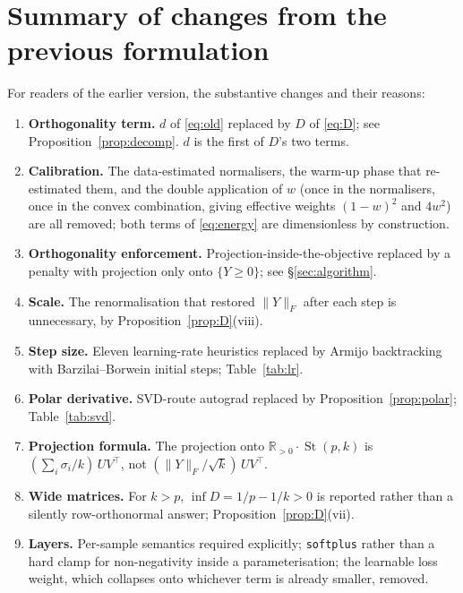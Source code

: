 \documentclass[11pt]{article}
\theoremstyle{definition}
\DeclareMathOperator{\st}{St}
\newcommand{\R}{\mathbb{R}}
\newcommand{\Rpos}{\R_{>0}}
\newcommand{\Fnorm}[1]{\lVert #1 \rVert_F}
\begin{document}



\appendix
\section{Summary of changes from the previous formulation}

For readers of the earlier version, the substantive changes and their reasons:

\begin{enumerate}\itemsep2pt
\item \textbf{Orthogonality term.} $d$ of \eqref{eq:old} replaced by $D$ of
  \eqref{eq:D}; see Proposition~\ref{prop:decomp}. $d$ is the first of $D$'s two
  terms.
\item \textbf{Calibration.} The data-estimated normalisers, the warm-up phase
  that re-estimated them, and the double application of $w$ (once in the
  normalisers, once in the convex combination, giving effective weights
  $(1-w)^2$ and $4w^2$) are all removed; both terms of \eqref{eq:energy} are
  dimensionless by construction.
\item \textbf{Orthogonality enforcement.} Projection-inside-the-objective
  replaced by a penalty with projection only onto $\{Y\ge0\}$; see
  \S\ref{sec:algorithm}.
\item \textbf{Scale.} The renormalisation that restored $\Fnorm{Y}$ after each
  step is unnecessary, by Proposition~\ref{prop:D}(viii).
\item \textbf{Step size.} Eleven learning-rate heuristics replaced by Armijo
  backtracking with Barzilai--Borwein initial steps; Table~\ref{tab:lr}.
\item \textbf{Polar derivative.} SVD-route autograd replaced by
  Proposition~\ref{prop:polar}; Table~\ref{tab:svd}.
\item \textbf{Projection formula.} The projection onto $\Rpos\cdot\st(p,k)$ is
  $(\sum_i\sigma_i/k)\,UV^\top$, not $(\Fnorm{Y}/\sqrt{k})\,UV^\top$.
\item \textbf{Wide matrices.} For $k>p$, $\inf D = 1/p-1/k>0$ is reported rather
  than a silently row-orthonormal answer; Proposition~\ref{prop:D}(vii).
\item \textbf{Layers.} Per-sample semantics required explicitly; \texttt{softplus}
  rather than a hard clamp for non-negativity inside a parameterisation; the
  learnable loss weight, which collapses onto whichever term is already smaller,
  removed.
\end{enumerate}
\end{document}
